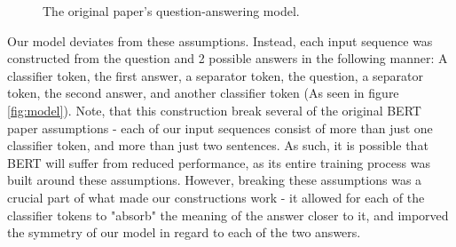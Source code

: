 \documentclass{article}
\begin{document}
\begin{figure}[h!]
\begin{center}
\end{center}
\caption{The original paper's question-answering model.}
\label{fig:model_orig}
\end{figure}

Our model deviates from these assumptions. Instead, each input sequence was constructed from the question and 2 possible answers in the following manner: A classifier token, the first answer, a separator token, the question, a separator token, the second answer, and another classifier token (As seen in figure \ref{fig:model}). Note, that this construction break several of the original BERT paper assumptions - each of our input sequences consist of more than just one classifier token, and more than just two sentences. As such, it is possible that BERT will suffer from reduced performance, as its entire training process was built around these assumptions.
However, breaking these assumptions was a crucial part of what made our constructions work - it allowed for each of the classifier tokens to "absorb" the meaning of the answer closer to it, and imporved the symmetry of our model in regard to each of the two answers.


\end{document}

